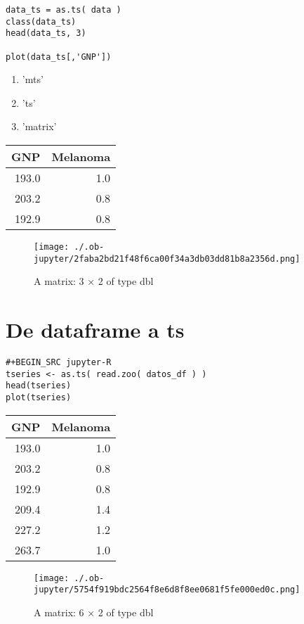\documentclass[11pt]{article}
\begin{document}
\begin{verbatim}
data_ts = as.ts( data )
class(data_ts)
head(data_ts, 3)

plot(data_ts[,'GNP'])
\end{verbatim}

\label{}
\begin{enumerate}
\item 'mts'
\item 'ts'
\item 'matrix'
\end{enumerate}
\begin{center}
\begin{tabular}{rr}
GNP & Melanoma\\
\hline
193.0 & 1.0\\
203.2 & 0.8\\
192.9 & 0.8\\
\end{tabular}
\end{center}
\begin{figure}[htbp]
\centering
\texttt{[image: ./.ob-jupyter/2faba2bd21f48f6ca00f34a3db03dd81b8a2356d.png]}
\caption{A matrix: 3 × 2 of type dbl}
\end{figure}
\section{De dataframe a ts}
\label{sec:org798f20b}


\begin{verbatim}
#+BEGIN_SRC jupyter-R
tseries <- as.ts( read.zoo( datos_df ) )
head(tseries)
plot(tseries)
\end{verbatim}

\label{}
\begin{center}
\begin{tabular}{rr}
GNP & Melanoma\\
\hline
193.0 & 1.0\\
203.2 & 0.8\\
192.9 & 0.8\\
209.4 & 1.4\\
227.2 & 1.2\\
263.7 & 1.0\\
\end{tabular}
\end{center}
\begin{figure}[htbp]
\centering
\texttt{[image: ./.ob-jupyter/5754f919bdc2564f8e6d8f8ee0681f5fe000ed0c.png]}
\caption{A matrix: 6 × 2 of type dbl}
\end{figure}
\end{document}
